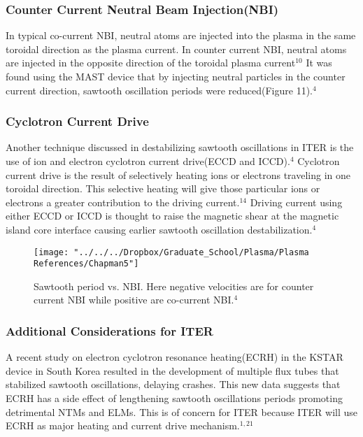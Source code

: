 \documentclass{article}
\begin{document}
\subsubsection{Counter Current Neutral Beam Injection(NBI)}
In typical co-current NBI, neutral atoms are injected into the plasma in the same toroidal direction as the plasma current.  In counter current NBI, neutral atoms are injected in the opposite direction of the toroidal plasma current$^{10}$  It was found using the MAST device that by injecting neutral particles in the counter current direction, sawtooth oscillation periods were reduced(Figure 11).$^{4}$
\subsubsection{Cyclotron Current Drive}
Another technique discussed in destabilizing sawtooth oscillations in ITER is the use of ion and electron cyclotron current drive(ECCD and ICCD).$^{4}$  Cyclotron current drive is the result of selectively heating ions or electrons traveling in one toroidal direction.  This selective heating will give those particular ions or electrons a greater contribution to the driving current.$^{14}$  Driving current using either ECCD or ICCD is thought to raise the magnetic shear at the magnetic island core interface causing earlier sawtooth oscillation destabilization.$^{4}$  
\begin{figure}
\centering
\texttt{[image: "../../../Dropbox/Graduate\_School/Plasma/Plasma References/Chapman5"]}
\caption{Sawtooth period vs. NBI. Here negative velocities are for counter current NBI while positive are co-current NBI.$^{4}$}
\label{fig:Chapman5}
\end{figure}
\subsubsection{Additional Considerations for ITER}
 A recent study on electron cyclotron resonance heating(ECRH) in the KSTAR device in South Korea resulted in the development of multiple flux tubes that stabilized sawtooth oscillations, delaying crashes.  This new data suggests that ECRH has a side effect of lengthening sawtooth oscillations periods promoting detrimental NTMs and ELMs.  This is of concern for ITER because ITER will use ECRH as major heating and current drive mechanism.$^{1,21}$
\newpage
\end{document}
